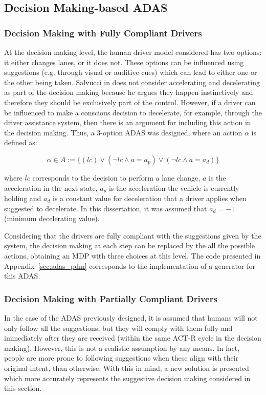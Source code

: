 \subsection{Decision Making-based ADAS}

\subsubsection{Decision Making with Fully Compliant Drivers}

At the decision making level, the human driver model considered has two options: it either changes lanes, or it does not. These options can be influenced using suggestions (e.g. through visual or auditive cues) which can lead to either one or the other being taken. Salvucci in \cite{salvucci_1} does not consider accelerating and decelerating as part of the decision making because he argues they happen instinctively and therefore they should be exclusively part of the control. However, if a driver can be influenced to make a conscious decision to decelerate, for example, through the driver assistance system, then there is an argument for including this action in the decision making. Thus, a 3-option ADAS was designed, where an action $\alpha$ is defined as:

\begin{equation}
	\alpha \in A := \{(lc) \vee (\neg lc \wedge a = a_p) \vee (\neg lc \wedge a = a_d)\}
\end{equation}

where $lc$ corresponds to the decision to perform a lane change, $a$ is the acceleration in the next state, $a_p$ is the acceleration the vehicle is currently holding and $a_d$ is a constant value for deceleration that a driver applies when suggested to decelerate. In this dissertation, it was assumed that $a_d = -1$ (minimum decelerating value).

Considering that the drivers are fully compliant with the suggestions given by the system, the decision making at each step can be replaced by the all the possible actions, obtaining an MDP with three choices at this level. The code presented in Appendix~\ref{sec:adas_pdm} corresponds to the implementation of a generator for this ADAS.

\subsubsection{Decision Making with Partially Compliant Drivers}

In the case of the ADAS previously designed, it is assumed that humans will not only follow all the suggestions, but they will comply with them fully and immediately after they are received (within the same ACT-R cycle in the decision making). However, this is not a realistic assumption by any means. In fact, people are more prone to following suggestions when these align with their original intent, than otherwise. With this in mind, a new solution is presented which more accurately represents the suggestive decision making considered in this section.

